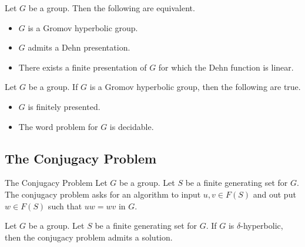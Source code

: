 \documentclass[a4paper]{article}
\begin{document}
\begin{thm}{}{} Let $G$ be a group. Then the following are equivalent. 
\begin{itemize}
\item $G$ is a Gromov hyperbolic group. 
\item $G$ admits a Dehn presentation. 
\item There exists a finite presentation of $G$ for which the Dehn function is linear. 
\end{itemize}
\end{thm}

\begin{crl}{}{} Let $G$ be a group. If $G$ is a Gromov hyperbolic group, then the following are true. 
\begin{itemize}
\item $G$ is finitely presented. 
\item The word problem for $G$ is decidable. 
\end{itemize}
\end{crl}

\subsection{The Conjugacy Problem}
\begin{defn}{The Conjugacy Problem}{} Let $G$ be a group. Let $S$ be a finite generating set for $G$. The conjugacy problem asks for an algorithm to input $u,v\in F(S)$ and out put $w\in F(S)$ such that $uw=wv$ in $G$. 
\end{defn}

\begin{thm}{}{} Let $G$ be a group. Let $S$ be a finite generating set for $G$. If $G$ is $\delta$-hyperbolic, then the conjugacy problem admits a solution. 
\end{thm}
\end{document}
